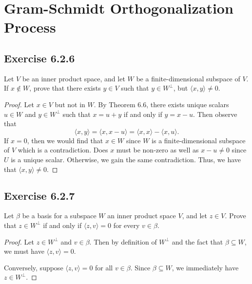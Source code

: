 \section{Gram-Schmidt Orthogonalization Process}

\subsection*{Exercise 6.2.6} Let \( V  \) be an inner product space, and let \( W  \) be a finite-dimensional subspace of \( V  \). If \( x \notin W  \), prove that there exists \( y \in V  \) such that \( y \in W^{\perp} \), but \( \langle x , y \rangle \neq 0  \).
\begin{proof}
Let \( x \in V  \) but not in \( W  \). By Theorem 6.6, there exists unique scalars \( u \in W  \) and \( y \in W^{\perp} \) such that \( x = u + y \) if and only if \( y = x - u  \). Then observe that
\[ \langle x , y \rangle = \langle x  , x - u  \rangle = \langle x , x \rangle - \langle x , u \rangle.\]
If \( x = 0  \), then we would find that \( x \in W  \) since \( W  \) is a finite-dimensional subspace of \( V  \) which is a contradiction. Does \( x  \) must be non-zero as well as \( x - u \neq 0  \) since \( U  \) is a unique scalar. Otherwise, we gain the same contradiction. Thus, we have that \( \langle x , y \rangle \neq 0  \). 
\end{proof}

\subsection*{Exercise 6.2.7} Let \( \beta \) be a basis for a subspace \( W  \) an inner product space \( V  \), and let \( z \in V  \). Prove that \( z \in W^{\perp} \) if and only if \( \langle z  ,  v  \rangle = 0  \) for every \( v \in \beta  \).
\begin{proof}
    Let \( z \in W^{\perp} \) and \( v \in \beta \). Then by definition of \( W^{\perp} \) and the fact that \( \beta \subseteq W  \), we must have \( \langle z , v  \rangle = 0  \).

    Conversely, suppose \( \langle z , v \rangle = 0  \) for all \( v \in \beta \). Since \( \beta \subseteq W \), we immediately have \( z \in W^{\perp} \).
\end{proof}

